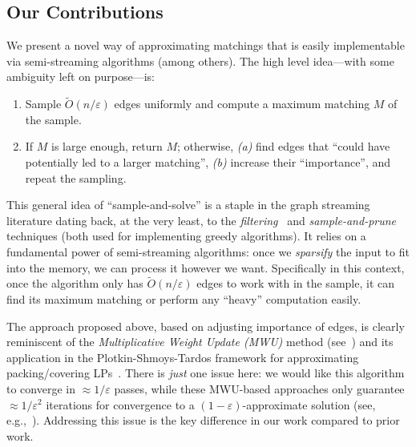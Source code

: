 \documentclass{theoretics}
\newenvironment{Ourbox}{\begin{mdframed}[hidealllines=false,innerleftmargin=10pt,backgroundcolor=white!10,innertopmargin=10pt,innerbottommargin=10pt,roundcorner=10pt]}{\end{mdframed}}
\newcommand{\Ot}{\widetilde{O}}
\newcommand{\eps}{\varepsilon}
\begin{document}

\subsection*{Our Contributions}
We present a novel way of approximating matchings that is easily implementable via semi-streaming algorithms (among others). 
The high level idea---with some ambiguity left on purpose---is: 
\begin{Ourbox}
	\begin{enumerate}
		\item Sample $\Ot(n/\eps)$ edges uniformly and compute a maximum matching $M$ of the sample. 
		\item If $M$ is large enough, return $M$; otherwise, \emph{(a)} find edges that ``could have potentially led to a larger matching'',
		\emph{(b)} increase their ``importance'',  and repeat the sampling. 
	\end{enumerate}
\end{Ourbox}
This general idea of ``sample-and-solve'' is a staple in the graph streaming literature dating back, at the very least, to the \emph{filtering}~\cite{LattanziMSV11} and \emph{sample-and-prune}~\cite{KumarMVV13} techniques (both used for implementing greedy algorithms). It relies on a fundamental power of semi-streaming algorithms: once we \emph{sparsify} the input to fit into the memory, we can process it however we want. Specifically in this context, 
once the algorithm only has $\Ot(n/\eps)$ edges to work with in the sample, it can find its maximum matching or perform any ``heavy'' computation easily. 

The approach proposed above, based on adjusting importance of edges, is clearly reminiscent of the \emph{Multiplicative Weight Update (MWU)} method (see~\cite{AroraHK12}) and its application in the Plotkin-Shmoys-Tardos framework for approximating
packing/covering LPs~\cite{PlotkinST91}. There is \emph{just} one issue here: we would like this algorithm to converge in $\approx 1/\eps$ passes, while these MWU-based approaches
only guarantee $\approx 1/\eps^2$ iterations for convergence to a $(1-\eps)$-approximate solution (see, e.g.,~\cite{KleinY99}). Addressing this issue is the key difference in our work compared to prior work. 
\end{document}
